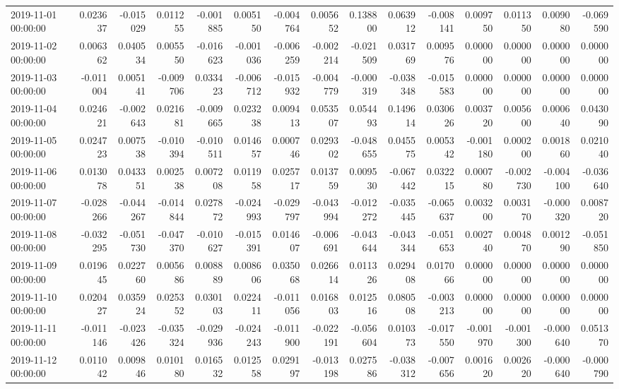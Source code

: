 \begin{tabular}{lrrrrrrrrrrrrrr}
2019-11-01 00:00:00 & 0.023637 & -0.015029 & 0.011255 & -0.001885 & 0.005150 & -0.004764 & 0.005652 & 0.138800 & 0.063912 & -0.008141 & 0.009750 & 0.011350 & 0.009080 & -0.069590 \\
2019-11-02 00:00:00 & 0.006362 & 0.040534 & 0.005550 & -0.016623 & -0.001036 & -0.006259 & -0.002214 & -0.021509 & 0.031769 & 0.009576 & 0.000000 & 0.000000 & 0.000000 & 0.000000 \\
2019-11-03 00:00:00 & -0.011004 & 0.005141 & -0.009706 & 0.033423 & -0.006712 & -0.015932 & -0.004779 & -0.000319 & -0.038348 & -0.015583 & 0.000000 & 0.000000 & 0.000000 & 0.000000 \\
2019-11-04 00:00:00 & 0.024621 & -0.002643 & 0.021681 & -0.009665 & 0.023238 & 0.009413 & 0.053507 & 0.054493 & 0.149614 & 0.030626 & 0.003720 & 0.005600 & 0.000640 & 0.043090 \\
2019-11-05 00:00:00 & 0.024723 & 0.007538 & -0.010394 & -0.010511 & 0.014657 & 0.000746 & 0.029302 & -0.048655 & 0.045575 & 0.005342 & -0.001180 & 0.000200 & 0.001860 & 0.021040 \\
2019-11-06 00:00:00 & 0.013078 & 0.043351 & 0.002538 & 0.007208 & 0.011958 & 0.025717 & 0.013759 & 0.009530 & -0.067442 & 0.032215 & 0.000780 & -0.002730 & -0.004100 & -0.036640 \\
2019-11-07 00:00:00 & -0.028266 & -0.044267 & -0.014844 & 0.027872 & -0.024993 & -0.029797 & -0.043994 & -0.012272 & -0.035445 & -0.065637 & 0.003200 & 0.003170 & -0.000320 & 0.008720 \\
2019-11-08 00:00:00 & -0.032295 & -0.051730 & -0.047370 & -0.010627 & -0.015391 & 0.014607 & -0.006691 & -0.043644 & -0.043344 & -0.051653 & 0.002740 & 0.004870 & 0.001290 & -0.051850 \\
2019-11-09 00:00:00 & 0.019645 & 0.022760 & 0.005686 & 0.008889 & 0.008606 & 0.035068 & 0.026614 & 0.011326 & 0.029408 & 0.017066 & 0.000000 & 0.000000 & 0.000000 & 0.000000 \\
2019-11-10 00:00:00 & 0.020427 & 0.035924 & 0.025352 & 0.030103 & 0.022411 & -0.011056 & 0.016803 & 0.012516 & 0.080508 & -0.003213 & 0.000000 & 0.000000 & 0.000000 & 0.000000 \\
2019-11-11 00:00:00 & -0.011146 & -0.023426 & -0.035324 & -0.029936 & -0.024243 & -0.011900 & -0.022191 & -0.056604 & 0.010373 & -0.017550 & -0.001970 & -0.001300 & -0.000640 & 0.051370 \\
2019-11-12 00:00:00 & 0.011042 & 0.009846 & 0.010180 & 0.016532 & 0.012558 & 0.029197 & -0.013198 & 0.027586 & -0.038312 & -0.007656 & 0.001620 & 0.002620 & -0.000640 & -0.000790 \\

\end{tabular}
